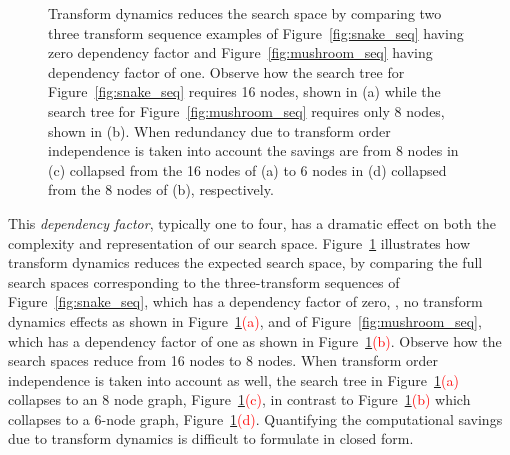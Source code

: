 \begin{figure}[ht]
\caption{Transform dynamics reduces the search space by comparing two three transform sequence examples of Figure~\ref{fig:snake_seq} having zero dependency factor and Figure~\ref{fig:mushroom_seq} having dependency factor of one. Observe how the search tree for Figure~\ref{fig:snake_seq} requires 16 nodes, shown in (a) while the search tree for Figure~\ref{fig:mushroom_seq} requires only 8 nodes, shown in (b). When redundancy due to transform order independence is taken into account the savings are from 8 nodes in (c) collapsed from the 16 nodes of (a) to 6 nodes in (d) collapsed from the 8 nodes of (b), respectively. }
  \label{fig:seq_cgraphs2}
\end{figure}
 
This \emph{dependency factor}, typically one to four, has a dramatic effect on both the complexity and representation of our search space. Figure~\ref{fig:seq_cgraphs2} illustrates how transform dynamics reduces the expected search space, by comparing the full search spaces corresponding to the three-transform sequences of Figure~\ref{fig:snake_seq}, which has a dependency factor of zero, \ie, no transform dynamics effects as shown in Figure~\ref{fig:seq_cgraphs2}\textcolor{red}{(a)}, and of Figure~\ref{fig:mushroom_seq}, which has a dependency factor of one as shown in Figure~\ref{fig:seq_cgraphs2}\textcolor{red}{(b)}. Observe how the search spaces reduce from 16 nodes to 8 nodes. When transform order independence is taken into account as well, the search tree in Figure~\ref{fig:seq_cgraphs2}\textcolor{red}{(a)} collapses to an 8 node graph, Figure~\ref{fig:seq_cgraphs2}\textcolor{red}{(c)}, in contrast to Figure~\ref{fig:seq_cgraphs2}\textcolor{red}{(b)} which collapses to a 6-node graph, Figure~\ref{fig:seq_cgraphs2}\textcolor{red}{(d)}. Quantifying the computational savings due to transform dynamics is difficult to formulate in closed form. 


